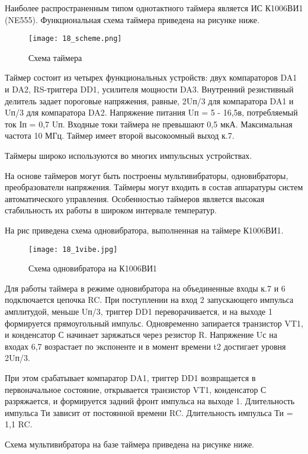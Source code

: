 Наиболее распространенным типом однотактного таймера является ИС К1006ВИ1 (NE555). Функциональная схема таймера приведена на рисунке ниже.

\begin{figure}[H]
\centering
\texttt{[image: 18\_scheme.png]}
\caption{Схема таймера}
\label{fig:18_scheme_2INT}
\end{figure}

Таймер состоит из четырех функциональных устройств: двух компараторов DA1 и DA2,  RS-триггера  DD1, усилителя мощности DA3. Внутренний резистивный делитель задает пороговые напряжения, равные, 2Uп/3 для компаратора DA1 и Uп/3 для компаратора DA2. Напряжение питания Uп = 5 - 16,5в, потребляемый ток Iп = 0,7 Uп. Входные токи таймера не превышают 0,5 мкА. Максимальная частота 10 МГц. Таймер имеет второй высокоомный выход к.7.

Таймеры широко используются во многих импульсных устройствах.

На основе таймеров могут быть построены мультивибраторы, одновибраторы, преобразователи напряжения. Таймеры могут входить в состав аппаратуры систем автоматического управления. Особенностью таймеров является высокая стабильность их работы в широком интервале температур.

На рис приведена схема одновибратора, выполненная на таймере К1006ВИ1.

\begin{figure}[H]
\centering
\texttt{[image: 18\_1vibe.jpg]}
\caption{Схема одновибратора на К1006ВИ1}
\label{fig:18_1vibe}
\end{figure}

Для работы таймера в режиме одновибратора на объединенные входы к.7 и 6 подключается цепочка RC. При поступлении на вход 2 запускающего импульса амплитудой, меньше Uп/3, триггер DD1 переворачивается, и на выходе 1 формируется прямоугольный импульс. Одновременно запирается транзистор VT1, и конденсатор С начинает заряжаться через резистор R. Напряжение Uс на входах 6,7 возрастает по экспоненте и в момент времени t2 достигает уровня 2Uп/3.

При этом срабатывает компаратор DA1, триггер DD1 возвращается в первоначальное состояние, открывается транзистор VT1, конденсатор С разряжается, и формируется задний фронт импульса на выходе 1. Длительность импульса Ти зависит от постоянной времени RC. Длительность импульса Ти = 1,1 RC.

Схема мультивибратора на базе таймера приведена на рисунке ниже.

